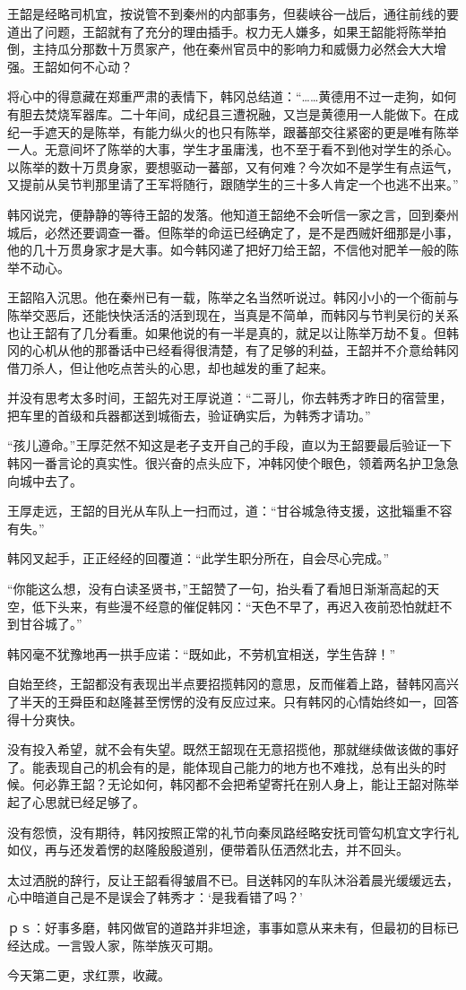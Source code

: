 王韶是经略司机宜，按说管不到秦州的内部事务，但裴峡谷一战后，通往前线的要道出了问题，王韶就有了充分的理由插手。权力无人嫌多，如果王韶能将陈举拍倒，主持瓜分那数十万贯家产，他在秦州官员中的影响力和威慑力必然会大大增强。王韶如何不心动？

将心中的得意藏在郑重严肃的表情下，韩冈总结道：“……黄德用不过一走狗，如何有胆去焚烧军器库。二十年间，成纪县三遭祝融，又岂是黄德用一人能做下。在成纪一手遮天的是陈举，有能力纵火的也只有陈举，跟蕃部交往紧密的更是唯有陈举一人。无意间坏了陈举的大事，学生才虽庸浅，也不至于看不到他对学生的杀心。以陈举的数十万贯身家，要想驱动一蕃部，又有何难？今次如不是学生有点运气，又提前从吴节判那里请了王军将随行，跟随学生的三十多人肯定一个也逃不出来。”

韩冈说完，便静静的等待王韶的发落。他知道王韶绝不会听信一家之言，回到秦州城后，必然还要调查一番。但陈举的命运已经确定了，是不是西贼奸细那是小事，他的几十万贯身家才是大事。如今韩冈递了把好刀给王韶，不信他对肥羊一般的陈举不动心。

王韶陷入沉思。他在秦州已有一载，陈举之名当然听说过。韩冈小小的一个衙前与陈举交恶后，还能快快活活的活到现在，当真是不简单，而韩冈与节判吴衍的关系也让王韶有了几分看重。如果他说的有一半是真的，就足以让陈举万劫不复。但韩冈的心机从他的那番话中已经看得很清楚，有了足够的利益，王韶并不介意给韩冈借刀杀人，但让他吃点苦头的心思，却也越发的重了起来。

并没有思考太多时间，王韶先对王厚说道：“二哥儿，你去韩秀才昨日的宿营里，把车里的首级和兵器都送到城衙去，验证确实后，为韩秀才请功。”

“孩儿遵命。”王厚茫然不知这是老子支开自己的手段，直以为王韶要最后验证一下韩冈一番言论的真实性。很兴奋的点头应下，冲韩冈使个眼色，领着两名护卫急急向城中去了。

王厚走远，王韶的目光从车队上一扫而过，道：“甘谷城急待支援，这批辎重不容有失。”

韩冈叉起手，正正经经的回覆道：“此学生职分所在，自会尽心完成。”

“你能这么想，没有白读圣贤书，”王韶赞了一句，抬头看了看旭日渐渐高起的天空，低下头来，有些漫不经意的催促韩冈：“天色不早了，再迟入夜前恐怕就赶不到甘谷城了。”

韩冈毫不犹豫地再一拱手应诺：“既如此，不劳机宜相送，学生告辞！”

自始至终，王韶都没有表现出半点要招揽韩冈的意思，反而催着上路，替韩冈高兴了半天的王舜臣和赵隆甚至愣愣的没有反应过来。只有韩冈的心情始终如一，回答得十分爽快。

没有投入希望，就不会有失望。既然王韶现在无意招揽他，那就继续做该做的事好了。能表现自己的机会有的是，能体现自己能力的地方也不难找，总有出头的时候。何必靠王韶？无论如何，韩冈都不会把希望寄托在别人身上，能让王韶对陈举起了心思就已经足够了。

没有怨愤，没有期待，韩冈按照正常的礼节向秦凤路经略安抚司管勾机宜文字行礼如仪，再与还发着愣的赵隆殷殷道别，便带着队伍洒然北去，并不回头。

太过洒脱的辞行，反让王韶看得皱眉不已。目送韩冈的车队沐浴着晨光缓缓远去，心中暗道自己是不是误会了韩秀才：‘是我看错了吗？’

ｐｓ：好事多磨，韩冈做官的道路并非坦途，事事如意从来未有，但最初的目标已经达成。一言毁人家，陈举族灭可期。

今天第二更，求红票，收藏。

